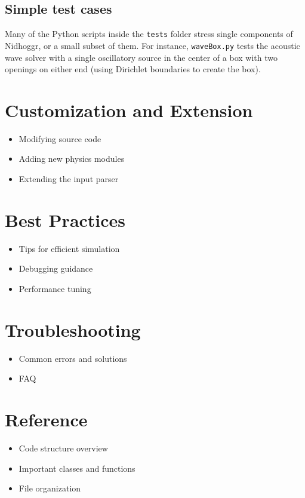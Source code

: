 \documentclass[12pt]{article}
\begin{document}
	\subsection{Simple test cases}

Many of the Python scripts inside the \texttt{tests} folder stress single components of Nidhoggr, or a small subset of them. For instance, \texttt{waveBox.py} tests the acoustic wave solver with a single oscillatory source in the center of a box with two openings on either end (using Dirichlet boundaries to create the box). 

\newpage
	
	\section{Customization and Extension}
	\begin{itemize}
		\item Modifying source code
		\item Adding new physics modules
		\item Extending the input parser
	\end{itemize}

\newpage
	
	\section{Best Practices}
	\begin{itemize}
		\item Tips for efficient simulation
		\item Debugging guidance
		\item Performance tuning
	\end{itemize}

\newpage
	
	\section{Troubleshooting}
	\begin{itemize}
		\item Common errors and solutions
		\item FAQ
	\end{itemize}

\newpage
	
	\section{Reference}
	\begin{itemize}
		\item Code structure overview
		\item Important classes and functions
		\item File organization
	\end{itemize}
\end{document}
